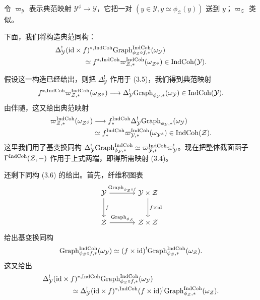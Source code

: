 令 $\varpi_{\mathcal{Y}}$ 表示典范映射 $\mathcal{Y}^\phi \to \mathcal{Y}$，它把一对 $(y \in \mathcal{Y}, y \simeq \phi_{\mathcal{Z}}(y))$ 送到 $y$；$\varpi_{\mathcal{Z}}$ 类似。%

下面，我们将构造典范同构：
\begin{equation}
  \begin{aligned}
    &\Delta^!_{\mathcal{Y}}(\mathrm{id} \times f)^{*,\mathrm{IndCoh}}
      \mathrm{Graph}^{\mathrm{IndCoh}}_{\phi_{\mathcal{Z}} \circ f,*}(\omega_{\mathcal{Y}})\\
    &\qquad\qquad \simeq f^{*,\mathrm{IndCoh}}\varpi^{\mathrm{IndCoh}}_{\mathcal{Z},*}(\omega_{\mathcal{Z}^\phi})
      \in \mathrm{IndCoh}(\mathcal{Y}).
  \end{aligned}
\end{equation}

假设这一构造已经给出，则把 $\Delta^!_{\mathcal{Y}}$ 作用于 (3.5)，我们得到典范映射
\[
  f^{*,\mathrm{IndCoh}}\varpi^{\mathrm{IndCoh}}_{\mathcal{Z},*}(\omega_{\mathcal{Z}^\phi})
  \longrightarrow \Delta^!_{\mathcal{Y}}\mathrm{Graph}_{\phi_{\mathcal{Y}},*}(\omega_{\mathcal{Y}})
  \in \mathrm{IndCoh}(\mathcal{Y}).
\]
由伴随，这又给出典范映射
\[
  \begin{aligned}
    \varpi^{\mathrm{IndCoh}}_{\mathcal{Z},*}(\omega_{\mathcal{Z}^\phi})
    &\longrightarrow f^{\mathrm{IndCoh}}_*\Delta^!_{\mathcal{Y}}
      \mathrm{Graph}_{\phi_{\mathcal{Y}},*}(\omega_{\mathcal{Y}})\\
    &\simeq f^{\mathrm{IndCoh}}_*\varpi^{\mathrm{IndCoh}}_{\mathcal{Y},*}(\omega_{\mathcal{Y}^\phi})
      \in \mathrm{IndCoh}(\mathcal{Z}).
  \end{aligned}
\]
这里我们用了基变换同构 $\Delta^!_{\mathcal{Y}}\mathrm{Graph}^{\mathrm{IndCoh}}_{\phi_{\mathcal{Y}},*} \simeq \varpi^{\mathrm{IndCoh}}_{\mathcal{Y},*}\varpi^!_{\mathcal{Y}}$。现在把整体截面函子 $\Gamma^{\mathrm{IndCoh}}(\mathcal{Z}, -)$ 作用于上式两端，即得所需映射 (3.4)。

还剩下同构 (3.6) 的给出。首先，纤维积图表
\[
  \begin{tikzcd}[column sep=large, row sep=large]
    \mathcal{Y} \arrow[r, "\mathrm{Graph}_{\phi_{\mathcal{Z}} \circ f}"] \arrow[d, "f"]
      & \mathcal{Y} \times \mathcal{Z} \arrow[d, "f \times \mathrm{id}"] \\
    \mathcal{Z} \arrow[r, "\mathrm{Graph}_{\phi_{\mathcal{Z}}}"]
      & \mathcal{Z} \times \mathcal{Z}
  \end{tikzcd}
\]
给出基变换同构
\[
  \mathrm{Graph}^{\mathrm{IndCoh}}_{\phi_{\mathcal{Z}} \circ f,*}(\omega_{\mathcal{Y}})
  \simeq (f \times \mathrm{id})^!\mathrm{Graph}^{\mathrm{IndCoh}}_{\phi_{\mathcal{Z}},*}(\omega_{\mathcal{Z}}).
\]
这又给出
\[
  \begin{aligned}
    &\Delta^!_{\mathcal{Y}}(\mathrm{id} \times f)^{*,\mathrm{IndCoh}}
      \mathrm{Graph}^{\mathrm{IndCoh}}_{\phi_{\mathcal{Z}} \circ f,*}(\omega_{\mathcal{Y}})\\
    &\qquad\qquad \simeq \Delta^!_{\mathcal{Y}}(\mathrm{id} \times f)^{*,\mathrm{IndCoh}}
      (f \times \mathrm{id})^!\mathrm{Graph}^{\mathrm{IndCoh}}_{\phi_{\mathcal{Z}},*}(\omega_{\mathcal{Z}}).
  \end{aligned}
\]

